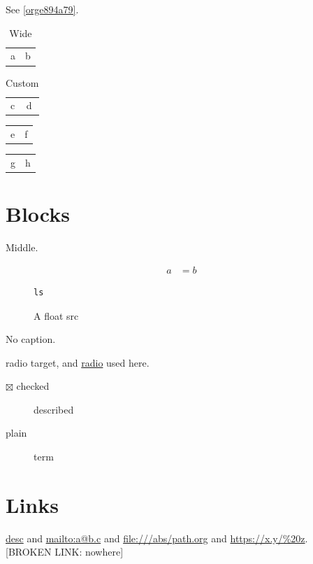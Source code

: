 See \ref{orge894a79}.\\

\begin{table}[htbp]
\caption{Wide}
\centering
\footnotesize
\begin{tabular}{ll}
a & b\\
\end{tabular}
\end{table}

\begin{table}[htbp]
\caption{Custom}
\centering
\begin{tabular}{ll}
c & d\\
\end{tabular}
\end{table}

\begin{table}[t]
\centering
\begin{tabular}{ll}
e & f\\
\end{tabular}
\end{table}

\begin{center}
\small
\begin{tabular}{ll}
g & h\\
\end{tabular}
\end{center}
\section{Blocks}
\label{sec:org6c7538d}
\label{org0711760}
\begin{center}
Middle.\\
\end{center}

\begin{align*}
\label{eq:org9dc24ab}
a &= b
\end{align*}

\begin{figure}[htbp]
\begin{verbatim}
ls
\end{verbatim}
\caption{A float src}
\end{figure}

\begin{mybox}
No caption.\\
\end{mybox}

\label{org5f46c53}radio target, and \hyperref[org5f46c53]{radio} used here.\\

\begin{description}
\item[{$\boxtimes$ checked}] described\\
\item[{plain}] term\\
\end{description}
\section{Links}
\label{sec:orgb5ff499}
\href{https://example.com/a\_b?x=1\&y=2}{desc} and \url{mailto:a@b.c} and \url{file:///abs/path.org} and \url{https://x.y/\%20z}.\\
{[}BROKEN LINK: nowhere]\\
